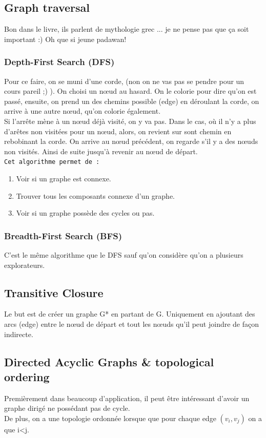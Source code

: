 \documentclass[a4paper]{article}
\begin{document}
\subsection{Graph traversal}
Bon dans le livre, ils parlent de mythologie grec ... je ne pense pas que ça soit important :) Oh que si jeune padawan!

\subsubsection{Depth-First Search (DFS)}
Pour ce faire, on se muni d'une corde, (non on ne vas pas se pendre pour un cours pareil ;) ). On choisi un nœud au hasard. On le colorie pour dire qu'on est passé, ensuite, on prend un des chemins possible (edge) en déroulant la corde, on arrive à une autre nœud, qu'on colorie également. \\
Si l'arrête mène à un nœud déjà visité, on y va pas. Dans le cas, où il n'y a plus d'arêtes non visitées pour un nœud, alors, on revient sur sont chemin en rebobinant la corde. On arrive au nœud précédent, on regarde s'il y a des nœuds non visités. Ainsi de suite jusqu'à revenir au nœud de départ.\\

\texttt{Cet algorithme permet de :}  
\begin{enumerate}
\item Voir si un graphe est connexe.
\item Trouver tous les composants connexe d'un graphe.
\item Voir si un graphe possède des cycles ou pas.
\end{enumerate}

\subsubsection{Breadth-First Search (BFS)}
C'est le même algorithme que le DFS sauf qu'on considère qu'on a plusieurs explorateurs.

\subsection{Transitive Closure}
Le but est de créer un graphe G* en partant de G. Uniquement en ajoutant des arcs (edge) entre le nœud de départ et tout les nœuds qu'il peut joindre de façon indirecte.

\subsection{Directed Acyclic Graphs \& topological ordering}
Premièrement dans beaucoup d'application, il peut être intéressant d'avoir un graphe dirigé ne possédant pas de cycle.\\
De plus, on a une topologie ordonnée lorsque que pour chaque edge $(v_i, v_j)$ on a que i<j.
\end{document}
